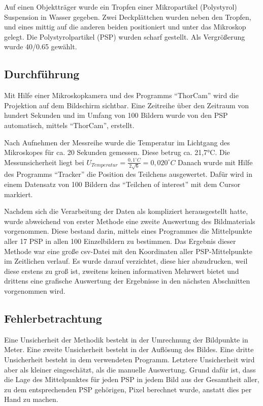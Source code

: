 \documentclass[
  9pt,
]{article}
\begin{document}
Auf einen Objektträger wurde ein Tropfen einer Mikropartikel
(Polystyrol) Suspension in Wasser gegeben. Zwei Deckplättchen wurden
neben den Tropfen, und eines mittig auf die anderen beiden positioniert
und unter das Mikroskop gelegt. Die Polystyrolpartikel (PSP) wurden
scharf gestellt. Als Vergrößerung wurde 40/0.65 gewählt.

\hypertarget{durchfuxfchrung}{%
\subsection{Durchführung}\label{durchfuxfchrung}}

Mit Hilfe einer Mikroskopkamera und des Programms ``ThorCam'' wird die
Projektion auf dem Bildschirm sichtbar. Eine Zeitreihe über den Zeitraum
von hundert Sekunden und im Umfang von 100 Bildern wurde von den PSP
automatisch, mittels ``ThorCam'', erstellt.

Nach Aufnehmen der Messreihe wurde die Temperatur im Lichtgang des
Mikroskopes für ca. 20 Sekunden gemessen. Diese betrug ca. 21,7°C. Die
Messunsicherheit liegt bei
\(U_{Temperatur}=\frac{0,1^{\circ}C}{2\sqrt{6}}= 0,020^{\circ}C\) Danach
wurde mit Hilfe des Programms ``Tracker'' die Position des Teilchens
ausgewertet. Dafür wird in einem Datensatz von 100 Bildern das
``Teilchen of interest'' mit dem Cursor markiert.

Nachdem sich die Verarbeitung der Daten als kompliziert herausgestellt
hatte, wurde abweichend von erster Methode eine zweite Auswertung des
Bildmaterials vorgenommen. Diese bestand darin, mittels eines Programmes
die Mittelpunkte aller 17 PSP in allen 100 Einzelbildern zu bestimmen.
Das Ergebnis dieser Methode war eine große csv-Datei mit den Koordinaten
aller PSP-Mittelpunkte im Zeitlichen verlauf. Es wurde darauf
verzichtet, diese hier abzudrucken, weil diese erstens zu groß ist,
zweitens keinen informativen Mehrwert bietet und drittens eine grafische
Auswertung der Ergebnisse in den nächsten Abschnitten vorgenommen wird.

\hypertarget{fehlerbetrachtung}{%
\subsection{Fehlerbetrachtung}\label{fehlerbetrachtung}}

Eine Unsicherheit der Methodik besteht in der Umrechnung der Bildpunkte
in Meter. Eine zweite Unsicherheit besteht in der Auflösung des Bildes.
Eine dritte Unsicherheit besteht in dem verwendeten Programm. Letztere
Unsicherheit wird aber als kleiner eingeschätzt, als die manuelle
Auswertung. Grund dafür ist, dass die Lage des Mittelpunktes für jeden
PSP in jedem Bild aus der Gesamtheit aller, zu dem entsprechenden PSP
gehörigen, Pixel berechnet wurde, anstatt dies per Hand zu machen.
\end{document}
